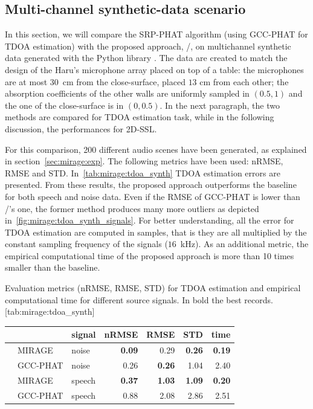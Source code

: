 \subsection{Multi-channel synthetic-data scenario}
In this section, we will compare the \ac{SRP-PHAT} algorithm (using GCC-PHAT for TDOA estimation) with the proposed approach, \MIRAGE/, on multichannel synthetic data generated with the Python library \href{https://github.com/LCAV/pyroomacoustics}.
The data are created to match the design of the Haru's microphone array placed on top of a table:
the microphones are at most 30~cm from the close-surface, placed $13$ cm from each other; the absorption coefficients of the other walls are uniformly sampled in $(0.5, 1)$ and the one of the close-surface is in $(0, 0.5)$.
In the next paragraph, the two methods are compared for \ac{TDOA} estimation task, while in the following discussion, the performances for 2D-\ac{SSL}.

\label{subsec:eval_synth_tdoa}
For this comparison, 200 different audio scenes have been generated, as explained in section~\cref{sec:mirage:exp}.
The following metrics have been used: \ac{nRMSE}, \ac{RMSE} and \ac{STD}.
In~\cref{tab:mirage:tdoa_synth} TDOA estimation errors are presented.
From these results, the proposed approach outperforms the baseline for both speech and noise data.
Even if the \ac{RMSE} of \ac{GCC-PHAT} is lower than \MIRAGE/'s one, the former method produces many more outliers as depicted in~\cref{fig:mirage:tdoa_synth_signals}.
For better understanding, all the error for \ac{TDOA} estimation are computed in samples, that is they are all multiplied by the constant sampling frequency of the signals ($16$~kHz).
As an additional metric, the empirical computational time of the proposed approach is more than 10 times smaller than the baseline.
\begin{table}[h]
    \begin{sidecaption}[]{
        Evaluation metrics (nRMSE, RMSE, STD) for TDOA estimation and empirical computational time for different source signals. In bold the best records.
    }[tab:mirage:tdoa_synth]
        \small
        \centering
        \begin{tabular*}{\linewidth}{@{\extracolsep{\fill}}lllrrrr@{}}
        \toprule
        &           &  signal &     nRMSE &       RMSE &       STD &      time \\
        \midrule
        & MIRAGE      &   noise &  \textbf{0.09} &  0.29 &  \textbf{0.26} &  \textbf{0.19} \\
        & GCC-PHAT    &   noise &  0.26 &  \textbf{0.26} &  1.04 &  2.40 \\
        \midrule
        & MIRAGE      &  speech &  \textbf{0.37} &  \textbf{1.03} &  \textbf{1.09} &  \textbf{0.20} \\
        & GCC-PHAT    &  speech &  0.88 &  2.08 &  2.86 &  2.51 \\
        \bottomrule
    \end{tabular*}
    \end{sidecaption}
\end{table}

